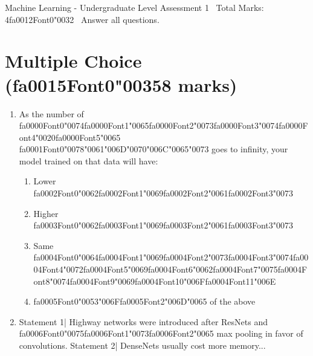 \documentclass[{\csname fa0013Font0\endcsname\char"0030}{\csname fa0014Font0\endcsname\char"0033}pt]{article}
\begin{document}
\begin{center}
Machine Learning - Undergraduate Level Assessment 1 \
Total Marks: 4{\csname fa0012Font0\endcsname\char"0032} \
Answer all questions.
\end{center}

\section*{Multiple Choice ({\csname fa0015Font0\endcsname\char"0035}8 marks)}
\begin{enumerate}[label=\arabic*.]
\item As the number of {\csname fa0000Font0\endcsname\char"0074}{\csname fa0000Font1\endcsname\char"0065}{\csname fa0000Font2\endcsname\char"0073}{\csname fa0000Font3\endcsname\char"0074}{\csname fa0000Font4\endcsname\char"0020}{\csname fa0000Font5\endcsname\char"0065} {\csname fa0001Font0\endcsname\char"0078}{\char"0061}{\char"006D}{\char"0070}{\char"006C}{\char"0065}{\char"0073} goes to infinity, your model trained on that data will have:
\begin{enumerate}[label=(\alph*)]
    \item Lower {\csname fa0002Font0\endcsname\char"0062}{\csname fa0002Font1\endcsname\char"0069}{\csname fa0002Font2\endcsname\char"0061}{\csname fa0002Font3\endcsname\char"0073}
    \item Higher {\csname fa0003Font0\endcsname\char"0062}{\csname fa0003Font1\endcsname\char"0069}{\csname fa0003Font2\endcsname\char"0061}{\csname fa0003Font3\endcsname\char"0073}
    \item Same {\csname fa0004Font0\endcsname\char"0064}{\csname fa0004Font1\endcsname\char"0069}{\csname fa0004Font2\endcsname\char"0073}{\csname fa0004Font3\endcsname\char"0074}{\csname fa0004Font4\endcsname\char"0072}{\csname fa0004Font5\endcsname\char"0069}{\csname fa0004Font6\endcsname\char"0062}{\csname fa0004Font7\endcsname\char"0075}{\csname fa0004Font8\endcsname\char"0074}{\csname fa0004Font9\endcsname\char"0069}{\csname fa0004Font10\endcsname\char"006F}{\csname fa0004Font11\endcsname\char"006E}
    \item {\csname fa0005Font0\endcsname\char"0053}{\char"006F}{\csname fa0005Font2\endcsname\char"006D}{\char"0065} of the above
\end{enumerate}
\item Statement 1| Highway networks were introduced after ResNets and {\csname fa0006Font0\endcsname\char"0075}{\csname fa0006Font1\endcsname\char"0073}{\csname fa0006Font2\endcsname\char"0065} max pooling in favor of convolutions. Statement 2| DenseNets usually cost more memory...

\end{enumerate}
\end{document}
